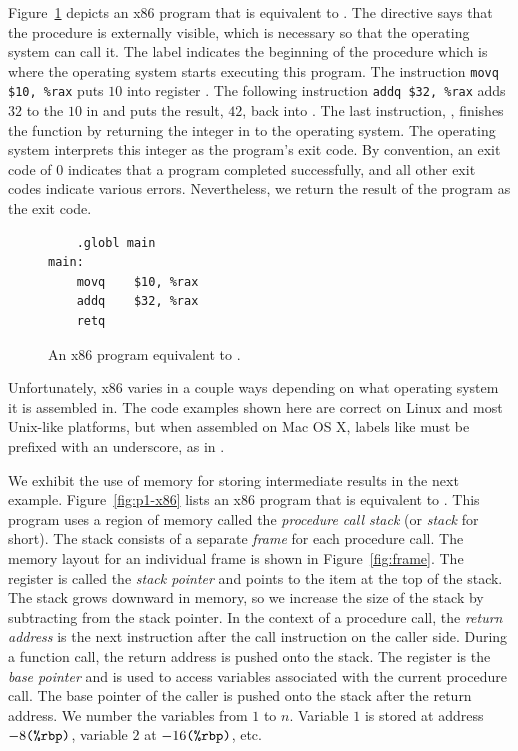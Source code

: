 \documentclass[11pt]{book}
\begin{document}
Figure~\ref{fig:p0-x86} depicts an x86 program that is equivalent
to . The  directive says that the
 procedure is externally visible, which is necessary so
that the operating system can call it. The label 
indicates the beginning of the  procedure which is where
the operating system starts executing this program.  The instruction
\lstinline{movq $10, %rax} puts $10$ into register . The
following instruction \lstinline{addq $32, %rax} adds $32$ to the
$10$ in  and puts the result, $42$, back into
  .
%
The last instruction, , finishes the  function by
returning the integer in  to the operating system. The
operating system interprets this integer as the program's exit
code. By convention, an exit code of 0 indicates that a program
completed successfully, and all other exit codes indicate various
errors.  Nevertheless, we return the result of the program as the exit
code.

\begin{figure}[tbp]
\begin{lstlisting}
	.globl main
main:
	movq	$10, %rax
	addq	$32, %rax
	retq
\end{lstlisting}
\caption{An x86 program equivalent to .}
\label{fig:p0-x86}
\end{figure}

Unfortunately, x86 varies in a couple ways depending on what operating
system it is assembled in. The code examples shown here are correct on
Linux and most Unix-like platforms, but when assembled on Mac OS X,
labels like  must be prefixed with an underscore, as in
.

We exhibit the use of memory for storing intermediate results in the
next example.  Figure~\ref{fig:p1-x86} lists an x86 program that is
equivalent to . This program uses a region of
memory called the \emph{procedure call stack} (or \emph{stack} for
short).  The stack consists
of a separate \emph{frame} for each procedure call. The
memory layout for an individual frame is shown in
Figure~\ref{fig:frame}.  The register  is called the
\emph{stack pointer} and points to the item at
the top of the stack. The stack grows downward in memory, so we
increase the size of the stack by subtracting from the stack pointer.
In the context of a procedure call, the \emph{return
  address} is the next instruction after the
call instruction on the caller side. During a function call, the
return address is pushed onto the stack.  The register  is
the \emph{base pointer} and is used to access
variables associated with the current procedure call.  The base
pointer of the caller is pushed onto the stack after the return
address. We number the variables from $1$ to $n$. Variable $1$ is
stored at address $-8\texttt{(\%rbp)}$, variable $2$ at
$-16\texttt{(\%rbp)}$, etc.
\end{document}
